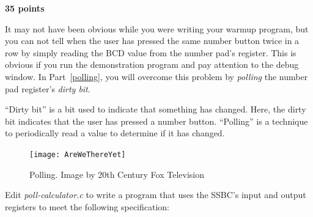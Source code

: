 \documentclass[12pt]{article}
\begin{document}
\textbf{35 points}

It may not have been obvious while you were writing your warmup program, but
you can not tell when the user has pressed the same number button twice in a
row by simply reading the BCD value from the number pad's register. This is
obvious if you run the demonstration program and pay attention to the debug
window. In Part~\ref{polling}, you will overcome this problem by
\textit{polling} the number pad register's \textit{dirty bit}.

``Dirty bit'' is a bit used to indicate that something has changed. Here, the
dirty bit indicates that the user has pressed a number button. ``Polling'' is a
technique to periodically read a value to determine if it has changed.

\begin{figure}
    \centering
    \texttt{[image: AreWeThereYet]}
    \caption{Polling. \tiny Image by 20th Century Fox Television}
\end{figure}

Edit \textit{poll-calculator.c} to write a program that uses the SSBC's input
and output registers to meet the following specification:
\end{document}
